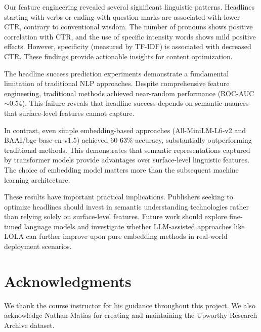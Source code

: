 \documentclass[11pt]{article}
\begin{document}
Our feature engineering revealed several significant linguistic patterns. Headlines starting with verbs or ending with question marks are associated with lower CTR, contrary to conventional wisdom. The number of pronouns shows positive correlation with CTR, and the use of specific intensity words shows mild positive effects. However, specificity (measured by TF-IDF) is associated with decreased CTR. These findings provide actionable insights for content optimization.

The headline success prediction experiments demonstrate a fundamental limitation of traditional NLP approaches. Despite comprehensive feature engineering, traditional methods achieved near-random performance (ROC-AUC $\sim$0.54). This failure reveals that headline success depends on semantic nuances that surface-level features cannot capture.

In contrast, even simple embedding-based approaches (All-MiniLM-L6-v2 and BAAI/bge-base-en-v1.5) achieved 60-63\% accuracy, substantially outperforming traditional methods. This demonstrates that semantic representations captured by transformer models provide advantages over surface-level linguistic features. The choice of embedding model matters more than the subsequent machine learning architecture.

These results have important practical implications. Publishers seeking to optimize headlines should invest in semantic understanding technologies rather than relying solely on surface-level features. Future work should explore fine-tuned language models and investigate whether LLM-assisted approaches like LOLA can further improve upon pure embedding methods in real-world deployment scenarios.

\section*{Acknowledgments}

We thank the course instructor for his guidance throughout this project. We also acknowledge Nathan Matias for creating and maintaining the Upworthy Research Archive dataset.



\end{document}
